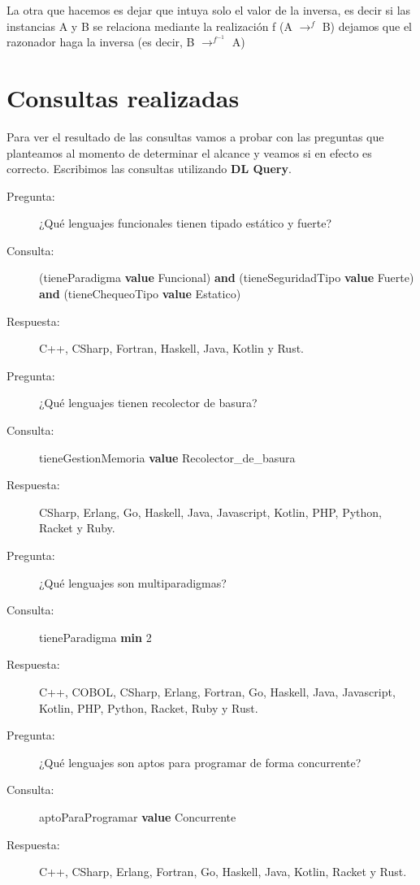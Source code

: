\documentclass[12pt, titlepage, a4paper]{article}
\newcommand{\high}[2]{{\color{#1} \textbf{#2}}}
\begin{document}
La otra que hacemos es dejar que intuya solo el valor de la inversa, 
es decir si las instancias A y B se relaciona mediante la realización 
f (A $\rightarrow^f$ B) dejamos que el razonador haga la inversa 
(es decir, B $\rightarrow^{f^{-1}}$ A)


\section{Consultas realizadas}
Para ver el resultado de las consultas vamos a probar con las 
preguntas que planteamos al momento de determinar el alcance y 
veamos si en efecto es correcto. Escribimos las consultas utilizando
\textbf{DL Query}.

\begin{description}
    \item[Pregunta:] ¿Qué lenguajes funcionales tienen tipado estático y fuerte?
    \item[Consulta:] (tieneParadigma \high{magenta}{value} Funcional) \high{cyan}{and} 
    (tieneSeguridadTipo \high{magenta}{value} Fuerte) \high{cyan}{and} 
    (tieneChequeoTipo \high{magenta}{value} Estatico)
    \item[Respuesta:] C++, CSharp, Fortran, Haskell, Java, Kotlin y Rust.\\
    
    \item[Pregunta:] ¿Qué lenguajes tienen recolector de basura?
    \item[Consulta:] tieneGestionMemoria \high{magenta}{value} Recolector\_de\_basura
    \item[Respuesta:] CSharp, Erlang, Go, Haskell, Java, Javascript, Kotlin, PHP, Python, Racket y Ruby.\\
    
    \item[Pregunta:] ¿Qué lenguajes son multiparadigmas?
    \item[Consulta:] tieneParadigma \high{magenta}{min} 2
    \item[Respuesta:] C++, COBOL, CSharp, Erlang, Fortran, Go, Haskell, Java, Javascript, Kotlin, PHP, Python, Racket, Ruby y Rust.\\
    
    \item[Pregunta:] ¿Qué lenguajes son aptos para programar de forma concurrente?
    \item[Consulta:] aptoParaProgramar \high{magenta}{value} Concurrente
    \item[Respuesta:] C++, CSharp, Erlang, Fortran, Go, Haskell, Java, Kotlin, Racket y Rust.\\
\end{description}
\end{document}
